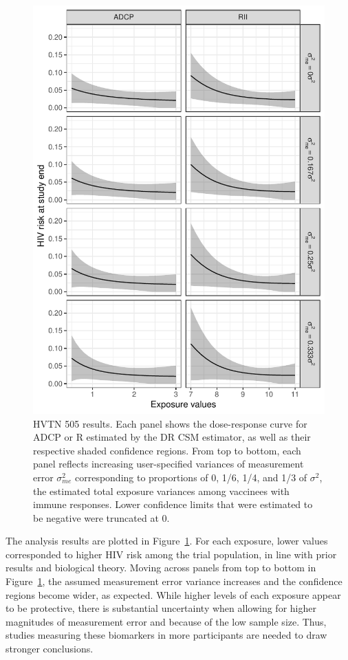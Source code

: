 \documentclass[useAMS,usenatbib,referee]{biom}
\newcommand{\RNum}[1]{\uppercase\expandafter{\romannumeral #1\relax}}
\begin{document}
\begin{figure}[h!]
\centering
\includegraphics[width=5.6in]{fig3-updated2.pdf}
\caption{HVTN 505 results. Each panel shows the dose-response curve for ADCP or R\RNum{2} estimated by the DR CSM estimator, as well as their respective shaded confidence regions. From top to bottom, each panel reflects increasing user-specified variances of measurement error $\sigma^{2}_{me}$ corresponding to proportions of 0, 1/6, 1/4, and 1/3 of $\sigma^{2}$, the estimated total exposure variances among vaccinees with immune responses. Lower confidence limits that were estimated to be negative were truncated at 0.}
\label{fig:three}
\end{figure}

The analysis results are plotted in Figure~\ref{fig:three}. For each exposure, lower values corresponded to higher HIV risk among the trial population, in line with prior results and biological theory. Moving across panels from top to bottom in Figure~\ref{fig:three}, the assumed measurement error variance increases and the confidence regions become wider, as expected. While higher levels of each exposure appear to be protective, there is substantial uncertainty when allowing for higher magnitudes of measurement error and because of the low sample size. Thus, studies measuring these biomarkers in more participants are needed to draw stronger conclusions.
\end{document}
